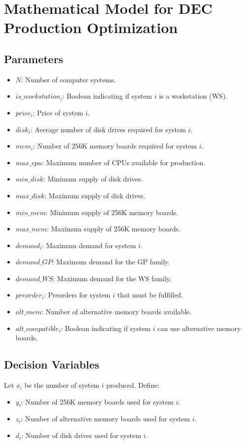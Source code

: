\documentclass{article}
\begin{document}
\section*{Mathematical Model for DEC Production Optimization}

\subsection*{Parameters}

\begin{itemize}
    \item \(N\): Number of computer systems.
    \item \(is\_workstation_i\): Boolean indicating if system \(i\) is a workstation (WS).
    \item \(price_i\): Price of system \(i\).
    \item \(disk_i\): Average number of disk drives required for system \(i\).
    \item \(mem_i\): Number of 256K memory boards required for system \(i\).
    \item \(max\_cpu\): Maximum number of CPUs available for production.
    \item \(min\_disk\): Minimum supply of disk drives.
    \item \(max\_disk\): Maximum supply of disk drives.
    \item \(min\_mem\): Minimum supply of 256K memory boards.
    \item \(max\_mem\): Maximum supply of 256K memory boards.
    \item \(demand_i\): Maximum demand for system \(i\).
    \item \(demand\_GP\): Maximum demand for the GP family.
    \item \(demand\_WS\): Maximum demand for the WS family.
    \item \(preorder_i\): Preorders for system \(i\) that must be fulfilled.
    \item \(alt\_mem\): Number of alternative memory boards available.
    \item \(alt\_compatible_i\): Boolean indicating if system \(i\) can use alternative memory boards.
\end{itemize}

\subsection*{Decision Variables}

Let \(x_i\) be the number of system \(i\) produced. Define:
\begin{itemize}
    \item \(y_i\): Number of 256K memory boards used for system \(i\).
    \item \(z_i\): Number of alternative memory boards used for system \(i\).
    \item \(d_i\): Number of disk drives used for system \(i\).
\end{itemize}
\end{document}
